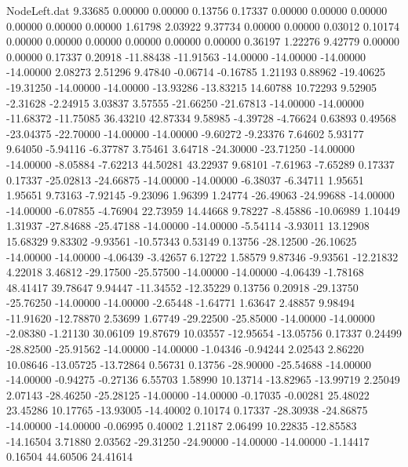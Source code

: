 \begin{filecontents}{NodeLeft.dat}
   9.33685    0.00000    0.00000     0.13756    0.17337    0.00000    0.00000    0.00000    0.00000    0.00000    0.00000    1.61798    2.03922
   9.37734    0.00000    0.00000     0.03012    0.10174    0.00000    0.00000    0.00000    0.00000    0.00000    0.00000    0.36197    1.22276
   9.42779    0.00000    0.00000     0.17337    0.20918  -11.88438  -11.91563  -14.00000  -14.00000  -14.00000  -14.00000    2.08273    2.51296
   9.47840   -0.06714   -0.16785     1.21193    0.88962  -19.40625  -19.31250  -14.00000  -14.00000  -13.93286  -13.83215   14.60788   10.72293
   9.52905   -2.31628   -2.24915     3.03837    3.57555  -21.66250  -21.67813  -14.00000  -14.00000  -11.68372  -11.75085   36.43210   42.87334
   9.58985   -4.39728   -4.76624     0.63893    0.49568  -23.04375  -22.70000  -14.00000  -14.00000   -9.60272   -9.23376    7.64602    5.93177
   9.64050   -5.94116   -6.37787     3.75461    3.64718  -24.30000  -23.71250  -14.00000  -14.00000   -8.05884   -7.62213   44.50281   43.22937
   9.68101   -7.61963   -7.65289     0.17337    0.17337  -25.02813  -24.66875  -14.00000  -14.00000   -6.38037   -6.34711    1.95651    1.95651
   9.73163   -7.92145   -9.23096     1.96399    1.24774  -26.49063  -24.99688  -14.00000  -14.00000   -6.07855   -4.76904   22.73959   14.44668
   9.78227   -8.45886  -10.06989     1.10449    1.31937  -27.84688  -25.47188  -14.00000  -14.00000   -5.54114   -3.93011   13.12908   15.68329
   9.83302   -9.93561  -10.57343     0.53149    0.13756  -28.12500  -26.10625  -14.00000  -14.00000   -4.06439   -3.42657    6.12722    1.58579
   9.87346   -9.93561  -12.21832     4.22018    3.46812  -29.17500  -25.57500  -14.00000  -14.00000   -4.06439   -1.78168   48.41417   39.78647
   9.94447  -11.34552  -12.35229     0.13756    0.20918  -29.13750  -25.76250  -14.00000  -14.00000   -2.65448   -1.64771    1.63647    2.48857
   9.98494  -11.91620  -12.78870     2.53699    1.67749  -29.22500  -25.85000  -14.00000  -14.00000   -2.08380   -1.21130   30.06109   19.87679
  10.03557  -12.95654  -13.05756     0.17337    0.24499  -28.82500  -25.91562  -14.00000  -14.00000   -1.04346   -0.94244    2.02543    2.86220
  10.08646  -13.05725  -13.72864     0.56731    0.13756  -28.90000  -25.54688  -14.00000  -14.00000   -0.94275   -0.27136    6.55703    1.58990
  10.13714  -13.82965  -13.99719     2.25049    2.07143  -28.46250  -25.28125  -14.00000  -14.00000   -0.17035   -0.00281   25.48022   23.45286
  10.17765  -13.93005  -14.40002     0.10174    0.17337  -28.30938  -24.86875  -14.00000  -14.00000   -0.06995    0.40002    1.21187    2.06499
  10.22835  -12.85583  -14.16504     3.71880    2.03562  -29.31250  -24.90000  -14.00000  -14.00000   -1.14417    0.16504   44.60506   24.41614

\end{filecontents}
